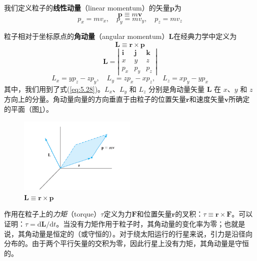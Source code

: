     我们定义粒子的\textbf{线性动量}（linear momentum）的矢量$\mathbf{p}$为
    \begin{equation}
        \boxed{
            \mathbf{p} \equiv m\mathbf{v}
        }
        \label{eq:5.35}
    \end{equation}
    \begin{equation}
        p_x = mv_x, \quad p_y = mv_y, \quad p_z = mv_z
        \label{eq:5.36}
    \end{equation}

    粒子相对于坐标原点的\textbf{角动量}（angular momentum）$\mathbf{L}$在经典力学中定义为
    \begin{equation}
        \boxed{
            \mathbf{L} \equiv \mathbf{r} \times \mathbf{p}
        }
        \label{eq:5.37}
    \end{equation}
    \begin{equation}
        \mathbf{L} = \left|
            \begin{array}{ccc}
            \mathbf{i} & \mathbf{j} & \mathbf{k} \\
            x & y & z \\
            p_x & p_y & p_z
            \end{array}
            \right|
        \label{eq:5.38}
    \end{equation}
    \begin{equation}
        L_x = yp_z - zp_y, \quad L_y = zp_x - xp_z, \quad L_z = xp_y - yp_x
        \label{eq:5.39}
    \end{equation}
    其中，我们用到了式(\ref{eq:5.28})。$L_x$、$L_y$ 和 $L_z$ 分别是角动量矢量 $\mathbf{L}$ 在 $x$、$y$ 和 $z$ 方向上的分量。角动量向量的方向垂直于由粒子的位置矢量$\mathbf{r}$和速度矢量$\mathbf{v}$所确定的平面（图\ref{fig:5.4}）。
    \begin{figure}[h!]
        \centering
        \includegraphics[width=0.5\textwidth]{Figures/5.4.png}
        \caption{$\mathbf{L \equiv \mathbf{r} \times \mathbf{p}}$}
        \label{fig:5.4}
    \end{figure}

    作用在粒子上的\textit{力矩}（torque）$\tau$定义为力$\mathbf{F}$和位置矢量$\mathbf{r}$的叉积：$\tau \equiv \mathbf{r} \times \mathbf{F}$。可以证明：$\tau = \mathrm{d}\mathbf{L} / \mathrm{d}t$。当没有力矩作用于粒子时，其角动量的变化率为零；也就是说，其角动量是恒定的（或守恒的）。对于绕太阳运行的行星来说，引力是沿径向分布的。由于两个平行矢量的交积为零，因此行星上没有力矩，其角动量是守恒的。

